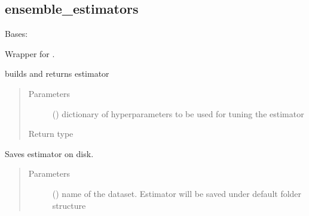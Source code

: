 \documentclass[letterpaper,10pt,english]{sphinxmanual}
\begin{document}
\subsection{ensemble\_estimators}
\label{\detokenize{estimators:module-mleap.estimators.ensemble_estimators}}\label{\detokenize{estimators:ensemble-estimators}}

\begin{fulllineitems}
\label{\detokenize{estimators:mleap.estimators.ensemble_estimators.Bagging_Classifier}}
Bases: {\hyperref[\detokenize{estimators:mleap.estimators.mleap_estimator.MleapEstimator}]{}}

Wrapper for .

\begin{fulllineitems}
\label{\detokenize{estimators:mleap.estimators.ensemble_estimators.Bagging_Classifier.build}}
builds and returns estimator
\begin{quote}\begin{description}
\item[{Parameters}] \leavevmode
{} () \textendash{} dictionary of hyperparameters to be used for tuning the estimator

\item[{Return type}] \leavevmode
{}

\end{description}\end{quote}

\end{fulllineitems}


\begin{fulllineitems}
\label{\detokenize{estimators:mleap.estimators.ensemble_estimators.Bagging_Classifier.save}}
Saves estimator on disk.
\begin{quote}\begin{description}
\item[{Parameters}] \leavevmode
{} () \textendash{} name of the dataset. Estimator will be saved under default folder structure 


\end{description}
\end{quote}
\end{fulllineitems}
\end{fulllineitems}
\end{document}
